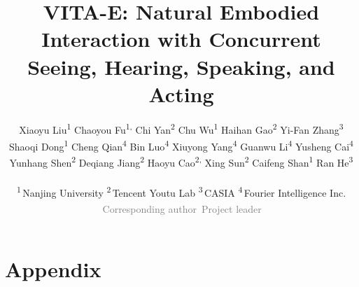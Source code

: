 \documentclass{article} %
\title{VITA-E: Natural Embodied Interaction with Concurrent Seeing, Hearing, Speaking, and Acting}
\author{%
\textnormal{Xiaoyu Liu\textsuperscript{1}}\quad
\textnormal{Chaoyou Fu\textsuperscript{1,\dag}}\quad
\textnormal{Chi Yan\textsuperscript{2}}\quad
\textnormal{Chu Wu\textsuperscript{1}}\quad
\textnormal{Haihan Gao\textsuperscript{2}}\quad
\textnormal{Yi-Fan Zhang\textsuperscript{3}}\quad \\
Shaoqi Dong\textsuperscript{1}\quad
Cheng Qian\textsuperscript{4}\quad
Bin Luo\textsuperscript{4}\quad
Xiuyong Yang\textsuperscript{4}\quad
Guanwu Li\textsuperscript{4}\quad
Yusheng Cai\textsuperscript{4}\quad \\
Yunhang Shen\textsuperscript{2}\quad
Deqiang Jiang\textsuperscript{2}\quad
Haoyu Cao\textsuperscript{2, \ddag}\quad
Xing Sun\textsuperscript{2}\quad
Caifeng Shan\textsuperscript{1}\quad
Ran He\textsuperscript{3} \\ \\
\textsuperscript{1}\,Nanjing University \quad
\textsuperscript{2}\,Tencent Youtu Lab \quad
\textsuperscript{3}\,CASIA \quad
\textsuperscript{4}\,Fourier Intelligence Inc. \\
\textcolor{gray}{\textsuperscript{\dag}\,Corresponding author} \quad
\textcolor{gray}{\textsuperscript{\ddag}\,Project leader} \\
}
\begin{document}
\maketitle













% 




\section{Appendix}

\end{document}
